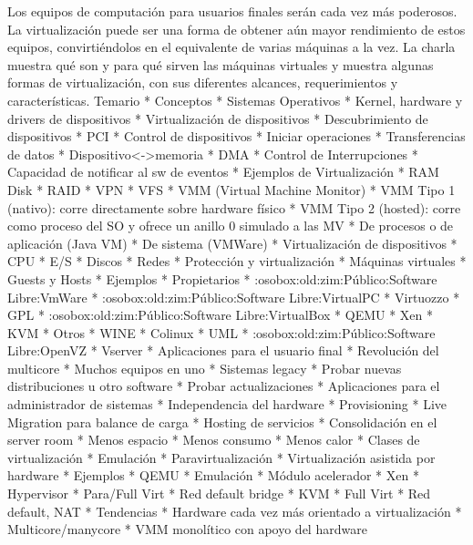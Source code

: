 Los equipos de computación para usuarios finales serán cada vez más
poderosos. La virtualización puede ser una forma de obtener aún mayor
rendimiento de estos equipos, convirtiéndolos en el equivalente de
varias máquinas a la vez. La charla muestra qué son y para qué sirven
las máquinas virtuales y muestra algunas formas de virtualización, con
sus diferentes alcances, requerimientos y características.
Temario
* Conceptos
	* Sistemas Operativos
		* Kernel, hardware y drivers de dispositivos
		* Virtualización de dispositivos
			* Descubrimiento de dispositivos
				* PCI
			* Control de dispositivos
				* Iniciar operaciones
			* Transferencias de datos 
				* Dispositivo<->memoria
				* DMA
			* Control de Interrupciones
				* Capacidad de notificar al sw de eventos
		* Ejemplos de Virtualización
			* RAM Disk
			* RAID
			* VPN
			* VFS
	* VMM (Virtual Machine Monitor)
		* VMM Tipo 1 (nativo): corre directamente sobre hardware físico 
		* VMM Tipo 2 (hosted): corre como proceso del SO y ofrece un anillo 0 simulado a las MV
		* De procesos o de aplicación (Java VM)
		* De sistema (VMWare)
	* Virtualización de dispositivos
		* CPU
		* E/S
		* Discos
		* Redes
	* Protección y virtualización
	* Máquinas virtuales
		* Guests y Hosts
	* Ejemplos
		* Propietarios
			* :osobox:old:zim:Público:Software Libre:VmWare
			* :osobox:old:zim:Público:Software Libre:VirtualPC
			* Virtuozzo
		* GPL
			* :osobox:old:zim:Público:Software Libre:VirtualBox
			* QEMU
			* Xen
			* KVM
		* Otros
			* WINE
			* Colinux
			* UML
			* :osobox:old:zim:Público:Software Libre:OpenVZ
			* Vserver
* Aplicaciones para el usuario final
	* Revolución del multicore
		* Muchos equipos en uno
	* Sistemas legacy
	* Probar nuevas distribuciones u otro software
	* Probar actualizaciones
* Aplicaciones para el administrador de sistemas
	* Independencia del hardware
	* Provisioning
	* Live Migration para balance de carga
	* Hosting de servicios
	* Consolidación en el server room
		* Menos espacio
		* Menos consumo
		* Menos calor
* Clases de virtualización
	* Emulación 
	* Paravirtualización
	* Virtualización asistida por hardware
* Ejemplos
	* QEMU
		* Emulación
		* Módulo acelerador
	* Xen
		* Hypervisor
		* Para/Full Virt
		* Red default bridge
	* KVM
		* Full Virt
		* Red default, NAT
* Tendencias
	* Hardware cada vez más orientado a virtualización
	* Multicore/manycore
	* VMM monolítico con apoyo del hardware
